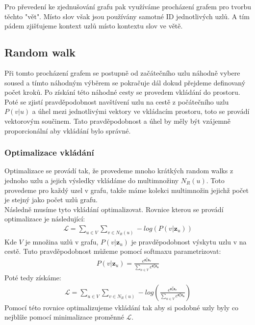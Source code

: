 Pro převedení ke zjednušování grafu pak využíváme procházení grafem pro tvorbu těchto "vět". Místo slov však jsou používány samotné ID jednotlivých uzlů. A tím
pádem zjišťujeme kontext uzlů místo kontextu slov ve větě. 

\subsection{Random walk}
Při tomto procházení grafem se postupně od začátečního uzlu náhodně vybere soused a tímto náhodným výběrem se pokračuje dál dokud přejdeme definovaný počet kroků.
Po získání této náhodné cesty se provedem vkládání do prostoru. Poté se zjistí pravděpodobnost navštívení uzlu na cestě z počátečního uzlu \(P(v|u)\) a úhel mezi
jednotlivými vektory ve vkládacím prostoru, toto se provádí vektorovým součinem. Tato pravděpodobnost a úhel by měly být vzájemně proporcionální aby vkládání bylo
správné.
\subsubsection{Optimalizace vkládání}
Optimalizace se provádí tak, že provedeme mnoho krátkých random walks z jednoho uzlu a jejich výsledky vkládáme do multimnožiny \(N_R(u)\). Toto provedeme pro
každý uzel v grafu, takže máme kolekci multimnožin jejichž počet je stejný jako počet uzlů grafu.\\
Následně musíme tyto vkládání optimalizovat. Rovnice kterou se provádí optimalizace je následující:\\
\begin{gather*}
    \mathcal{L} = \sum_{u \in V} \sum_{v \in N_R(u)} -log(P(v|\mathbf{z}_u))
\end{gather*}
Kde \(V\) je množina uzlů v grafu, \(P(v|\mathbf{z}_u)\) je pravděpodobnost výskytu uzlu v na cestě. Tuto pravděpodobnost můžeme pomocí softmaxu parametrizovat:\\
\begin{gather*}
    P(v|\mathbf{z}_u) = \frac{e^{\mathbf{z}_u^T \mathbf{z_v}}}{\sum_{n \in V}e^{\mathbf{z}_u^T \mathbf{z_n}}}
\end{gather*}
Poté tedy získáme:\\
\begin{gather*}
    \mathcal{L} = \sum_{u \in V} \sum_{v \in N_R(u)} -log(\frac{e^{\mathbf{z}_u^T \mathbf{z_v}}}{\sum_{n \in V}e^{\mathbf{z}_u^T \mathbf{z_n}}})
\end{gather*}
Pomocí této rovnice optimalizujeme vkládání tak aby si podobné uzly byly co nejblíže pomocí minimalizace proměnné \(\mathcal{L}\). 

